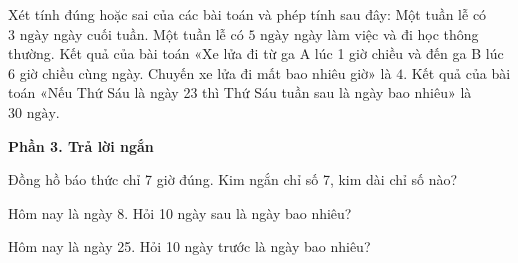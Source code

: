 \begin{ex} %
Xét tính đúng hoặc sai của các bài toán và phép tính sau đây:
\choiceTF
{Một tuần lễ có $3\text{ ngày}$ ngày cuối tuần.}
{\True Một tuần lễ có $5\text{ ngày}$ ngày làm việc và đi học thông thường.}
{Kết quả của bài toán «Xe lửa đi từ ga A lúc 1 giờ chiều và đến ga B lúc 6 giờ chiều cùng ngày. Chuyến xe lửa đi mất bao nhiêu giờ» là $4$.}
{\True Kết quả của bài toán «Nếu Thứ Sáu là ngày 23 thì Thứ Sáu tuần sau là ngày bao nhiêu» là $30\text{ ngày}$.}
\end{ex}

\textbf{Phần 3. Trả lời ngắn}

\begin{ex} %
Đồng hồ báo thức chỉ 7 giờ đúng. Kim ngắn chỉ số 7, kim dài chỉ số nào?
\end{ex}

\begin{ex} %
Hôm nay là ngày 8. Hỏi 10 ngày sau là ngày bao nhiêu?
\end{ex}

\begin{ex} %
Hôm nay là ngày 25. Hỏi 10 ngày trước là ngày bao nhiêu?
\end{ex}

